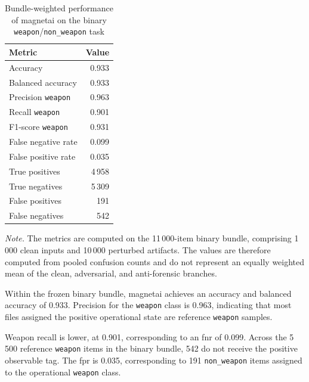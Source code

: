 \begin{table}[H]
\centering
\caption{Bundle-weighted performance of \gls{magnetai} on the binary
\texttt{weapon}/\texttt{non\_weapon} task}
\label{tab:results-magnet-global-metrics}
\small
\begin{tabular}{@{}l r@{}}
\toprule
\textbf{Metric} &
\textbf{Value} \\
\midrule

Accuracy
& 0.933 \\

Balanced accuracy
& 0.933 \\

Precision \texttt{weapon}
& 0.963 \\

Recall \texttt{weapon}
& 0.901 \\

F1-score \texttt{weapon}
& 0.931 \\

False negative rate
& 0.099 \\

False positive rate
& 0.035 \\

True positives
& 4\,958 \\

True negatives
& 5\,309 \\

False positives
& 191 \\

False negatives
& 542 \\

\bottomrule
\end{tabular}

\vspace{0.4em}
\footnotesize
\textit{Note.} The metrics are computed on the 11\,000-item binary bundle,
comprising 1\,000 clean inputs and 10\,000 perturbed artifacts. The values are
therefore computed from pooled confusion counts and do not represent an
equally weighted mean of the clean, adversarial, and anti-forensic branches.
\end{table}

Within the frozen binary bundle, \gls{magnetai} achieves an accuracy and
balanced accuracy of 0.933. Precision for the \texttt{weapon} class is 0.963,
indicating that most files assigned the positive operational state are
reference \texttt{weapon} samples.

Weapon recall is lower, at 0.901, corresponding to an \gls{fnr} of 0.099.
Across the 5\,500 reference \texttt{weapon} items in the binary bundle, 542 do
not receive the positive observable tag. The \gls{fpr} is 0.035, corresponding
to 191 \texttt{non\_weapon} items assigned to the operational
\texttt{weapon} class.

